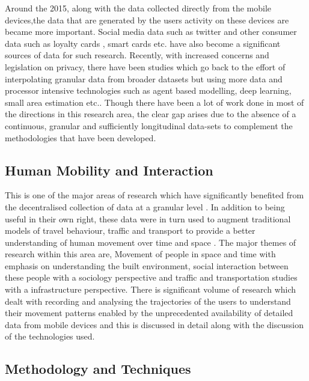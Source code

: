 Around the 2015, along with the data collected directly from the mobile devices,the data that are generated by the users activity on these devices are became more important.
Social media data such as twitter \citep{lansley2016} and other consumer data such as loyalty cards \citep{lloyd2018}, smart cards \citep{ordonez2012} etc. have also become a significant sources of data for such research.
Recently, with increased concerns and legislation on privacy, there have been studies which go back to the effort of interpolating granular data from broader datasets but using more data and processor intensive technologies such as agent based modelling, deep learning, small area estimation \citep{crols2019, shibata2019, rao2015} etc..
Though there have been a lot of work done in most of the directions in this research area, the clear gap arises due to the absence of a continuous, granular and sufficiently longitudinal data-sets to complement the methodologies that have been developed. 

\subsection{Human Mobility and Interaction}

This is one of the major areas of research which have significantly benefited from the decentralised collection of data at a granular level \cite{castells2000}.
In addition to being useful in their own right, these data were in turn used to augment traditional models of travel behaviour, traffic and transport to provide a better understanding of human movement over time and space \citep{janssens2013}.
The major themes of research within this area are, Movement of people in space and time with emphasis on understanding the built environment, social interaction between these people with a sociology perspective and traffic and transportation studies with a infrastructure perspective.
There is significant volume of research which dealt with recording and analysing the trajectories of the users to understand their movement patterns enabled by the unprecedented availability of detailed data from mobile devices and this is discussed in detail along with the discussion of the technologies used.

\subsection{Methodology and Techniques}

